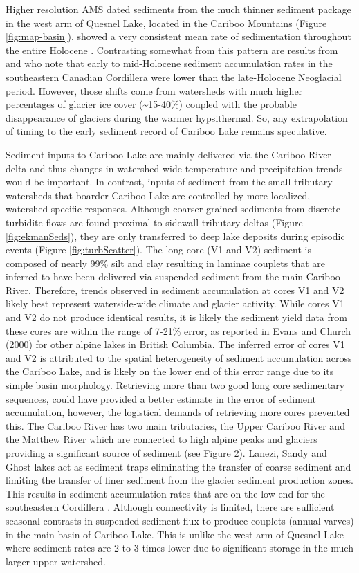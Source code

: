 \documentclass[Royal,times,doublespace,sageh]{sagej}
\begin{document}
Higher resolution AMS dated sediments from the much thinner sediment
package in the west arm of Quesnel Lake, located in the Cariboo
Mountains (Figure \ref{fig:map-basin}), showed a very consistent mean
rate of sedimentation throughout the entire Holocene
\citep{Gilbert2012}. Contrasting somewhat from this pattern are results
from \citet{Menounos2009b} and \citet{Desloges1999} who note that early
to mid-Holocene sediment accumulation rates in the southeastern Canadian
Cordillera were lower than the late-Holocene Neoglacial period. However,
those shifts come from watersheds with much higher percentages of
glacier ice cover (\textasciitilde15-40\%) coupled with the probable
disappearance of glaciers during the warmer hypsithermal. So, any
extrapolation of timing to the early sediment record of Cariboo Lake
remains speculative.

Sediment inputs to Cariboo Lake are mainly delivered via the Cariboo
River delta and thus changes in watershed-wide temperature and
precipitation trends would be important. In contrast, inputs of sediment
from the small tributary watersheds that boarder Cariboo Lake are
controlled by more localized, watershed-specific responses. Although
coarser grained sediments from discrete turbidite flows are found
proximal to sidewall tributary deltas (Figure \ref{fig:ekmanSeds}), they
are only transferred to deep lake deposits during episodic events
(Figure \ref{fig:turbScatter}). The long core (V1 and V2) sediment is
composed of nearly 99\% silt and clay resulting in laminae couplets that
are inferred to have been delivered via suspended sediment from the main
Cariboo River. Therefore, trends observed in sediment accumulation at
cores V1 and V2 likely best represent waterside-wide climate and glacier
activity. While cores V1 and V2 do not produce identical results, it is
likely the sediment yield data from these cores are within the range of
7-21\% error, as reported in Evans and Church (2000) for other alpine
lakes in British Columbia. The inferred error of cores V1 and V2 is
attributed to the spatial heterogeneity of sediment accumulation across
the Cariboo Lake, and is likely on the lower end of this error range due
to its simple basin morphology. Retrieving more than two good long core
sedimentary sequences, could have provided a better estimate in the
error of sediment accumulation, however, the logistical demands of
retrieving more cores prevented this. The Cariboo River has two main
tributaries, the Upper Cariboo River and the Matthew River which are
connected to high alpine peaks and glaciers providing a significant
source of sediment (see Figure 2). Lanezi, Sandy and Ghost lakes act as
sediment traps eliminating the transfer of coarse sediment and limiting
the transfer of finer sediment from the glacier sediment production
zones. This results in sediment accumulation rates that are on the
low-end for the southeastern Cordillera \citep{Hodder2006}. Although
connectivity is limited, there are sufficient seasonal contrasts in
suspended sediment flux to produce couplets (annual varves) in the main
basin of Cariboo Lake. This is unlike the west arm of Quesnel Lake where
sediment rates are 2 to 3 times lower due to significant storage in the
much larger upper watershed.
\end{document}
